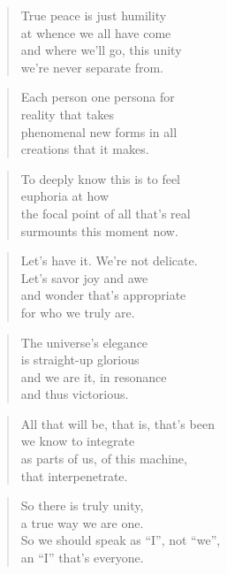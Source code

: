 \documentclass[10pt,a4paper]{article}
\begin{document}
\begin{multicols}{2}
\begin{verse}
True peace is just humility\\
at whence we all have come\\
and where we’ll go, this unity\\
we’re never separate from.
\end{verse}

\begin{verse}
Each person one persona for\\
reality that takes\\
phenomenal new forms in all\\
creations that it makes.
\end{verse}

\begin{verse}
To deeply know this is to feel\\
euphoria at how\\
the focal point of all that’s real\\
surmounts this moment now.
\end{verse}

\begin{verse}
Let’s have it. We’re not delicate.\\
Let’s savor joy and awe\\
and wonder that’s appropriate\\
for who we truly are.
\end{verse}

\begin{verse}
The universe’s elegance\\
is straight-up glorious\\
and we are it, in resonance\\
and thus victorious.
\end{verse}

\begin{verse}
All that will be, that is, that’s been\\
we know to integrate\\
as parts of us, of this machine,\\
that interpenetrate.
\end{verse}

\begin{verse}
So there is truly unity,\\
a true way we are one.\\
So we should speak as “I”, not “we”,\\
an “I” that’s everyone.
\end{verse}


\end{multicols}
\end{document}
